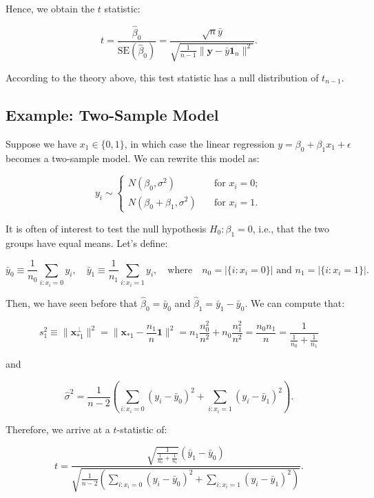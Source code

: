 \documentclass[
  11pt,
  letterpaper,
  oneside]{book}
\theoremstyle{definition}
\theoremstyle{plain}
\theoremstyle{plain}
\theoremstyle{plain}
\theoremstyle{remark}
\begin{document}
Hence, we obtain the \(t\) statistic:

\[
t = \frac{\widehat{\beta}_0}{\text{SE}(\widehat{\beta}_0)} = \frac{\sqrt{n} \bar{y}}{\sqrt{\frac{1}{n-1}\|\boldsymbol{y} - \bar{y} \boldsymbol{1}_n\|^2}}.
\]

According to the theory above, this test statistic has a null
distribution of \(t_{n-1}\).

\hypertarget{example-two-sample-model}{%
\subsection{Example: Two-Sample Model}\label{example-two-sample-model}}

Suppose we have \(x_1 \in \{0,1\}\), in which case the linear regression
\(y = \beta_0 + \beta_1 x_1 + \epsilon\) becomes a two-sample model. We
can rewrite this model as:

\[
y_i \sim \begin{cases}
N(\beta_0, \sigma^2) \quad &\text{for } x_i = 0; \\
N(\beta_0 + \beta_1, \sigma^2) \quad &\text{for } x_i = 1.
\end{cases}
\]

It is often of interest to test the null hypothesis
\(H_0: \beta_1 = 0\), i.e., that the two groups have equal means. Let's
define:

\[
\bar{y}_0 \equiv \frac{1}{n_0}\sum_{i: x_i = 0} y_i, \quad \bar{y}_1 \equiv \frac{1}{n_1}\sum_{i: x_i = 1} y_i, \quad \text{where} \quad n_0 = |\{i: x_i = 0\}| \text{ and } n_1 = |\{i: x_i = 1\}|.
\]

Then, we have seen before that \(\widehat{\beta}_0 = \bar{y}_0\) and
\(\widehat{\beta}_1 = \bar{y}_1 - \bar{y}_0\). We can compute that:

\[
s_1^2 \equiv \|\boldsymbol{x}_{*1}^{\perp}\|^2 = \|\boldsymbol{x}_{*1} - \frac{n_1}{n}\boldsymbol{1}\|^2 = n_1\frac{n_0^2}{n^2} + n_0\frac{n_1^2}{n^2} = \frac{n_0 n_1}{n} = \frac{1}{\frac{1}{n_0} + \frac{1}{n_1}}
\]

and

\[
\widehat{\sigma}^2 = \frac{1}{n-2}\left(\sum_{i: x_i = 0}(y_i - \bar{y}_0)^2 + \sum_{i: x_i = 1}(y_i - \bar{y}_1)^2\right).
\]

Therefore, we arrive at a \(t\)-statistic of:

\[
t = \frac{\sqrt{\frac{1}{\frac{1}{n_0} + \frac{1}{n_1}}}(\bar{y}_1 - \bar{y}_0)}{\sqrt{\frac{1}{n-2}\left(\sum_{i: x_i = 0}(y_i - \bar{y}_0)^2 + \sum_{i: x_i = 1}(y_i - \bar{y}_1)^2\right)}}.
\]
\end{document}
